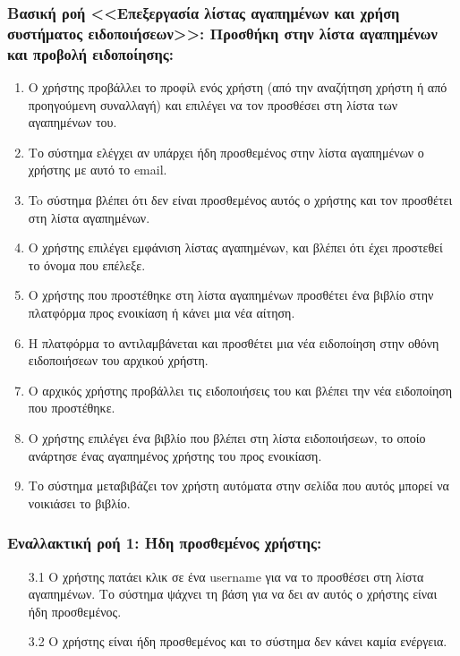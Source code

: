 \documentclass[12pt,a4paper]{article}
\begin{document}
\subsubsection*{Βασική ροή <<Επεξεργασία λίστας αγαπημένων και χρήση συστήματος ειδοποιήσεων>>: Προσθήκη στην λίστα αγαπημένων και προβολή ειδοποίησης:}
\begin{enumerate}
    \item Ο χρήστης προβάλλει το προφίλ ενός χρήστη (από την αναζήτηση χρήστη ή από προηγούμενη συναλλαγή) και επιλέγει να τον προσθέσει στη λίστα των αγαπημένων του.
    \item Το σύστημα ελέγχει αν υπάρχει ήδη προσθεμένος στην λίστα αγαπημένων ο χρήστης με αυτό το email.
    \item To σύστημα βλέπει ότι δεν είναι προσθεμένος αυτός ο χρήστης και τον προσθέτει στη λίστα αγαπημένων.
    \item Ο χρήστης επιλέγει εμφάνιση λίστας αγαπημένων, και βλέπει ότι έχει προστεθεί το όνομα που επέλεξε.
    \item Ο χρήστης που προστέθηκε στη λίστα αγαπημένων προσθέτει ένα βιβλίο στην πλατφόρμα προς ενοικίαση ή κάνει μια νέα αίτηση.
    \item Η πλατφόρμα το αντιλαμβάνεται και προσθέτει μια νέα ειδοποίηση στην οθόνη ειδοποιήσεων του αρχικού χρήστη.
    \item Ο αρχικός χρήστης προβάλλει τις ειδοποιήσεις του και βλέπει την νέα ειδοποίηση που προστέθηκε.
    \item Ο χρήστης επιλέγει ένα βιβλίο που βλέπει στη λίστα ειδοποιήσεων, το οποίο ανάρτησε ένας αγαπημένος χρήστης του προς ενοικίαση.
    \item Το σύστημα μεταβιβάζει τον χρήστη αυτόματα στην σελίδα που αυτός μπορεί να νοικιάσει το βιβλίο.
\end{enumerate}

\subsubsection*{Εναλλακτική ροή 1: Ήδη προσθεμένος χρήστης:}
\begin{enumerate}
    \item [3.1] Ο χρήστης πατάει κλικ σε ένα username για να το προσθέσει στη λίστα αγαπημένων. Το σύστημα ψάχνει τη βάση για να δει αν αυτός ο χρήστης είναι ήδη προσθεμένος.
    \item [3.2] Ο χρήστης είναι ήδη προσθεμένος και το σύστημα δεν κάνει καμία ενέργεια.
\end{enumerate}
\end{document}
